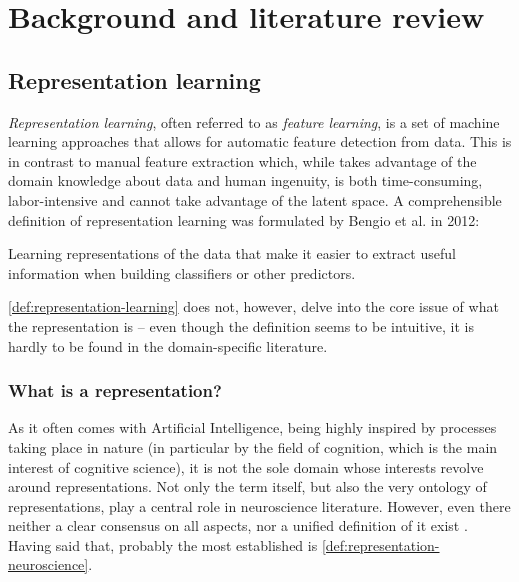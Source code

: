 \chapter{Background and literature review}\label{chapter:background}
\thispagestyle{chapterBeginStyle}
\label{theoretical-background}

\section{Representation learning}
\textit{Representation learning}, often referred to as \textit{feature learning}, is a set of machine learning approaches that allows for automatic feature detection from data. This is in contrast to manual feature extraction which, while takes advantage of the domain knowledge about data and human ingenuity, is both time-consuming, labor-intensive and cannot take advantage of the latent space. A comprehensible definition of representation learning was formulated by Bengio et al. \cite{Bengio2012} in 2012:

    \begin{definition}\label{def:representation-learning}
    Learning representations of the data that make it easier to extract useful information when building classifiers or other predictors.
    \end{definition}
\autoref{def:representation-learning} does not, however, delve into the core issue of what the representation is – even though the definition seems to be intuitive, it is hardly to be found in the domain-specific literature.

\vspace{\baselineskip}
\subsection{What is a representation?}\label{subsec:representation}
As it often comes with Artificial Intelligence, being highly inspired by processes taking place in nature (in particular by the field of cognition, which is the main interest of cognitive science), it is not the sole domain whose interests revolve around representations. Not only the term itself, but also the very ontology of representations, play a central role in neuroscience literature. However, even there neither a clear consensus on all aspects, nor a unified definition of it exist \cite{Vilarroya2017}. Having said that, probably the most established is \autoref{def:representation-neuroscience}.

